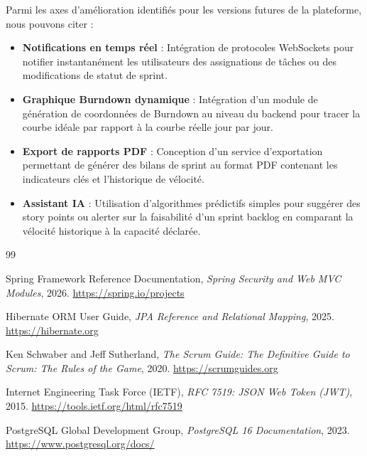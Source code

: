 \documentclass[12pt,a4paper]{report}
\begin{document}
Parmi les axes d'amélioration identifiés pour les versions futures de la plateforme, nous pouvons citer :
\begin{itemize}
\item \textbf{Notifications en temps réel} : Intégration de protocoles WebSockets pour notifier instantanément les utilisateurs des assignations de tâches ou des modifications de statut de sprint.
\item \textbf{Graphique Burndown dynamique} : Intégration d'un module de génération de coordonnées de Burndown au niveau du backend pour tracer la courbe idéale par rapport à la courbe réelle jour par jour.
\item \textbf{Export de rapports PDF} : Conception d'un service d'exportation permettant de générer des bilans de sprint au format PDF contenant les indicateurs clés et l'historique de vélocité.
\item \textbf{Assistant IA} : Utilisation d'algorithmes prédictifs simples pour suggérer des story points ou alerter sur la faisabilité d'un sprint backlog en comparant la vélocité historique à la capacité déclarée.
\end{itemize}


\begin{thebibliography}{99}

Spring Framework Reference Documentation, \textit{Spring Security and Web MVC Modules}, 2026. \url{https://spring.io/projects}

Hibernate ORM User Guide, \textit{JPA Reference and Relational Mapping}, 2025. \url{https://hibernate.org}

Ken Schwaber and Jeff Sutherland, \textit{The Scrum Guide: The Definitive Guide to Scrum: The Rules of the Game}, 2020. \url{https://scrumguides.org}

Internet Engineering Task Force (IETF), \textit{RFC 7519: JSON Web Token (JWT)}, 2015. \url{https://tools.ietf.org/html/rfc7519}

PostgreSQL Global Development Group, \textit{PostgreSQL 16 Documentation}, 2023. \url{https://www.postgresql.org/docs/}

\end{thebibliography}

\end{document}
